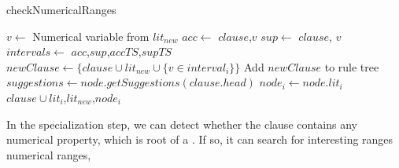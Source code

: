 \begin{algorithm}[!h]
 \caption{checkNumericalRanges}
 \label{alg4}
 \KwOut{}
  $v \leftarrow $ Numerical variable from $lit_{new}$ \;
  $acc \leftarrow $ $clause$,$v$\FuncSty{)} \;
  $sup \leftarrow $ $clause$, $v$\FuncSty{)} \;
  $intervals \leftarrow $  $acc$,$sup$,$accTS$,$supTS$\FuncSty{)} \;
   {
     $newClause \leftarrow \{clause \cup lit_{new} \cup \{v \in interval_i\}\}$ \;
     Add $newClause$ to rule tree \;
  }
  $suggestions \leftarrow node.getSuggestions(clause.head)$ \;
   {
    $node_i \leftarrow node$.$lit_i$\FuncSty{)} \;
    $clause \cup lit_i$,$lit_{new}$,$node_i$\FuncSty{)} \;
  }
\end{algorithm}

In the specialization step, we can detect whether the clause contains any numerical property, which is root of a
\graphname. If so, it can search for interesting ranges numerical ranges, 

